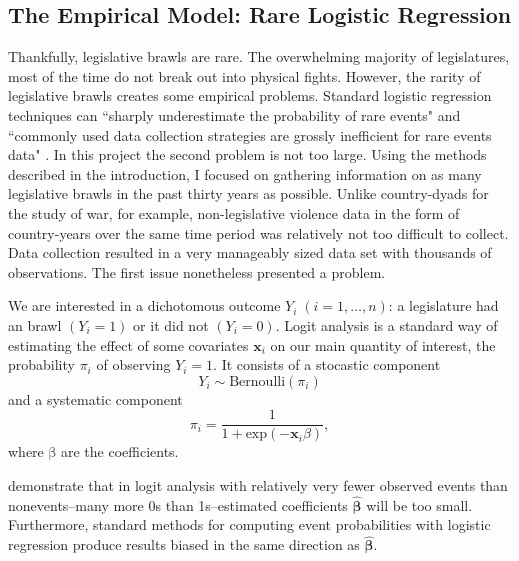 \documentclass[a4paper]{article}\usepackage{graphicx, color}
\begin{document}
{{%
\subsection{The Empirical Model: Rare Logistic Regression}

Thankfully, legislative brawls are rare. The overwhelming majority of legislatures, most of the time do not break out into physical fights. However, the rarity of legislative brawls creates some empirical problems. Standard logistic regression techniques can ``sharply underestimate the probability of rare events" and ``commonly used data collection strategies are grossly inefficient for rare events data" \cite[137]{KingRareEventsPA2001}. In this project the second problem is not too large. Using the methods described in the introduction, I focused on gathering information on as many legislative brawls in the past thirty years as possible. Unlike country-dyads for the study of war, for example, non-legislative violence data in the form of country-years over the same time period was relatively not too difficult to collect. Data collection resulted in a very manageably sized data set with thousands of observations. The first issue nonetheless presented a problem.

We are interested in a dichotomous outcome $Y_{i}\; (i = 1, \ldots, n)$: a legislature had an brawl $(Y_{i} = 1)$ or it did not $(Y_{i} = 0)$. Logit analysis is a standard way of estimating the effect of some covariates $\mathbf{x}_{i}$ on our main quantity of interest, the probability $\pi_{i}$ of observing $Y_{i} = 1$. It consists of a stocastic component
%
\begin{equation}
    Y_{i} \sim \mathrm{Bernoulli}(\pi_{i})
\end{equation}
%
and a systematic component 
%
\begin{equation}
    \pi_{i} = \frac{1}{1 + \mathrm{exp}(-\mathbf{x}_{i} \beta)},
\end{equation}
%
where $\mathrm{\beta}$ are the coefficients.

\cite{KingRareEventsPA2001} demonstrate that in logit analysis with relatively very fewer observed events than nonevents--many more 0s than 1s--estimated coefficients $\mathbf{\hat\beta}$ will be too small. Furthermore, standard methods for computing event probabilities with logistic regression produce results biased in the same direction as $\mathbf{\hat\beta}$. 

}}
\end{document}
